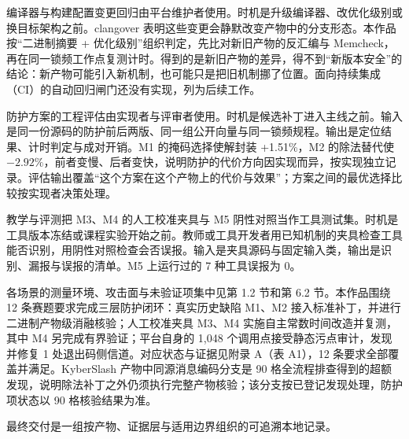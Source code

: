 编译器与构建配置变更回归由平台维护者使用。时机是升级编译器、改优化级别或换目标架构之前。clangover 表明这些变更会静默改变产物中的分支形态\cite{clangover}。本作品按“二进制摘要 + 优化级别”组织判定，先比对新旧产物的反汇编与 Memcheck，再在同一锁频工作点复测计时。得到的是新旧产物的差异，得不到“新版本安全”的结论：新产物可能引入新机制，也可能只是把旧机制挪了位置。面向持续集成（CI）的自动回归闸门还没有实现，列为后续工作。

防护方案的工程评估由实现者与评审者使用。时机是候选补丁进入主线之前。输入是同一份源码的防护前后两版、同一组公开向量与同一锁频规程。输出是定位结果、计时判定与成对开销。M1 的掩码选择使解封装 +1.51\%，M2 的除法替代使 $-2.92\%$，前者变慢、后者变快，说明防护的代价方向因实现而异，按实现独立记录。评估输出覆盖“这个方案在这个产物上的代价与效果”；方案之间的最优选择比较按实现者决策处理。%

教学与评测把 M3、M4 的人工校准夹具与 M5 阴性对照当作工具测试集。时机是工具版本冻结或课程实验开始之前。教师或工具开发者用已知机制的夹具检查工具能否识别，用阴性对照检查会否误报。输入是夹具源码与固定输入类，输出是识别、漏报与误报的清单。M5 上运行过的 7 种工具误报为 0。%

各场景的测量环境、攻击面与未验证项集中见第 1.2 节和第 6.2 节。本作品围绕 12 条赛题要求完成三层防护闭环：真实历史缺陷 M1、M2 接入标准补丁，并进行二进制产物级消融核验；人工校准夹具 M3、M4 实施自主常数时间改造并复测，其中 M4 另完成有界验证；平台自身的 1,048 个调用点接受静态污点审计，发现并修复 1 处退出码侧信道。对应状态与证据见附录 A（表 A1），12 条要求全部覆盖并满足。KyberSlash 产物中同源消息编码分支是 90 格全流程排查得到的超额发现，说明除法补丁之外仍须执行完整产物核验；该分支按已登记发现处理，防护项状态以 90 格核验结果为准。%

最终交付是一组按产物、证据层与适用边界组织的可追溯本地记录。
